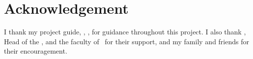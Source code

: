 \chapter*{Acknowledgement}


I thank my project guide, \guidename, \guidedesignation, for guidance
throughout this project. I also thank \hodname, Head of the
\departmentname, and the faculty of \collegename\ for their support, and my
family and friends for their encouragement.

\vspace{2.5cm}

\noindent
\begin{flushright}
\studentname
\end{flushright}

\clearpage
